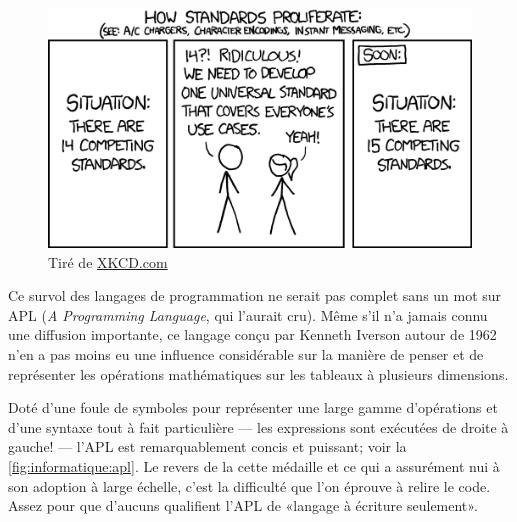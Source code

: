 \begin{figure}[t]
  \centering
  \begin{minipage}{0.9\linewidth}
    \includegraphics{standards} \\
    \footnotesize\sffamily%
    Tiré de \href{http://xkcd.com/927/}{XKCD.com}
  \end{minipage}
\end{figure}

Ce survol des langages de programmation ne serait pas complet sans un
mot sur APL (\emph{A Programming Language}, qui l'aurait cru). Même
s'il n'a jamais connu une diffusion importante, ce langage conçu par
Kenneth Iverson autour de 1962 n'en a pas moins eu une influence
considérable sur la manière de penser et de représenter les opérations
mathématiques sur les tableaux à plusieurs dimensions.

Doté d'une foule de symboles pour représenter une large gamme
d'opérations et d'une syntaxe tout à fait particulière --- les
expressions sont exécutées de droite à gauche! --- l'APL est
remarquablement concis et puissant; voir la
\autoref{fig:informatique:apl}. Le revers de la cette médaille et ce
qui a assurément nui à son adoption à large échelle, c'est la
difficulté que l'on éprouve à relire le code. Assez pour que d'aucuns
qualifient l'APL de «langage à écriture seulement».

